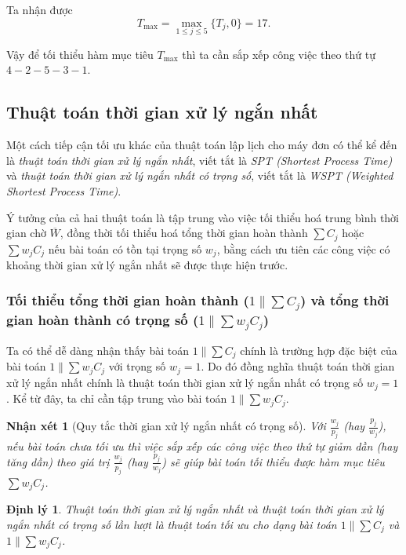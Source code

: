 \documentclass[12pt,a4paper]{report}
\newtheorem{dl}{Định lý}
\newtheorem{nx}{Nhận xét}
\begin{document}
Ta nhận được
\begin{equation*}
	T_{\max} = \max _{1 \leq j \leq 5} \{T_j, 0\} = 17.
\end{equation*}

Vậy để tối thiểu hàm mục tiêu $T_{\max}$ thì ta cần sắp xếp công việc theo thứ tự $4-2-5-3-1$.
\subsection{Thuật toán thời gian xử lý ngắn nhất}
Một cách tiếp cận tối ưu khác của thuật toán lập lịch cho máy đơn có thể kể đến là \textit{thuật toán thời gian xử lý ngắn nhất}, viết tắt là \textit{SPT (Shortest Process Time)} và \textit{thuật toán thời gian xử lý ngắn nhất có trọng số}, viết tắt là \textit{WSPT (Weighted Shortest Process Time)}.

Ý tưởng của cả hai thuật toán là tập trung vào việc tối thiểu hoá trung bình thời gian chờ $\overline{W}$, đồng thời tối thiểu hoá tổng thời gian hoàn thành $\sum C_j$ hoặc $\sum w_j C_j$ nếu bài toán có tồn tại trọng số $w_j$, bằng cách ưu tiên các công việc có khoảng thời gian xử lý ngắn nhất sẽ được thực hiện trước. 

\subsubsection*{Tối thiểu tổng thời gian hoàn thành ($1 \| \sum C_j$) và tổng thời gian hoàn thành có trọng số ($1 \| \sum w_j C_j$)}
Ta có thể dễ dàng nhận thấy bài toán $1 \| \sum C_j$ chính là trường hợp đặc biệt của bài toán $1 \| \sum w_j C_j$ với trọng số $w_j=1$. Do đó đồng nghĩa thuật toán thời gian xử lý ngắn nhất chính là thuật toán thời gian xử lý ngắn nhất có trọng số $w_j=1$. Kể từ đây, ta chỉ cần tập trung vào bài toán $1\| \sum w_j C_j$.

\begin{nx}[Quy tắc thời gian xử lý ngắn nhất có trọng số]
Với $\frac{w_j}{p_j}$ (hay $\frac{p_j}{w_j}$), nếu bài toán chưa tối ưu thì việc sắp xếp các công việc theo thứ tự giảm dần (hay tăng dần) theo giá trị $\frac{w_j}{p_j}$ (hay $\frac{p_j}{w_j}$) sẽ giúp bài toán tối thiểu được hàm mục tiêu $\sum w_j C_j$.
\end{nx}

\begin{dl}
	Thuật toán thời gian xử lý ngắn nhất và thuật toán thời gian xử lý ngắn nhất có trọng số lần lượt là thuật toán tối ưu cho dạng bài toán $1 \| \sum C_j$ và $1 \| \sum w_j C_j$.
\end{dl}
\end{document}
